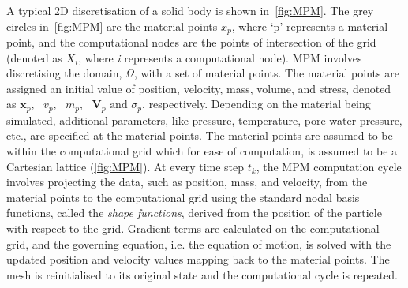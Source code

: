 

A typical 2D discretisation of a solid body is shown in~\cref{fig:MPM}. The 
grey circles in~\cref{fig:MPM} are the material points $x_{p}$, where `p' 
represents a material point, and the computational nodes are the points of 
intersection of 
the grid (denoted as $X_{i}$, where \textit{i} represents a computational 
node). MPM involves discretising the domain, $\Omega$, with 
a set of material points. The material points are assigned an initial value of 
position, velocity, mass, volume, and stress, denoted as 
$\mathbf{x}_{p},\mbox{  
} \mathbf{\mathit{v}}_{p},\mbox{  } \mathit{m}_{p}, \mbox{  
}\mathbf{V}_{p}\mbox{ and }\sigma_{p} $, respectively. Depending on the 
material being 
simulated, additional parameters, like pressure, temperature, pore-water 
pressure, etc., are specified at the material points. The material points are 
assumed to be within the computational grid which for ease of computation, 
is assumed to be a Cartesian lattice (\cref{fig:MPM}). At 
every time step $\mathit{t}_{k}$, the MPM computation cycle involves projecting 
the data, such as position, mass, and velocity, from the material points to the 
computational grid using the standard nodal basis functions, called the 
\textit{shape functions}, derived from the position of the particle with 
respect to the grid. Gradient terms are calculated on the computational grid,
and the governing equation, i.e. the equation of motion, is solved with the 
updated position and velocity values mapping back to the material points. 
The mesh is reinitialised to its original state and the computational cycle is 
repeated. 

